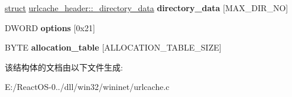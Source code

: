 \begin{DoxyCompactItemize}
\item 
\mbox{\label{structurlcache__header_a15e31b37e8c85a75369972ae50c7c396}} 
\hyperlink{interfacestruct}{struct} \hyperlink{structurlcache__header_1_1__directory__data}{urlcache\+\_\+header\+::\+\_\+directory\+\_\+data} {\bfseries directory\+\_\+data} \mbox{[}M\+A\+X\+\_\+\+D\+I\+R\+\_\+\+NO\mbox{]}
\item 
\mbox{\label{structurlcache__header_ad0e8c7288f1a53180cc921ec951994b8}} 
D\+W\+O\+RD {\bfseries options} \mbox{[}0x21\mbox{]}
\item 
\mbox{\label{structurlcache__header_ac985e20bb7cebff96e5b1aafd7a2c1e6}} 
B\+Y\+TE {\bfseries allocation\+\_\+table} \mbox{[}A\+L\+L\+O\+C\+A\+T\+I\+O\+N\+\_\+\+T\+A\+B\+L\+E\+\_\+\+S\+I\+ZE\mbox{]}
\end{DoxyCompactItemize}


该结构体的文档由以下文件生成\+:\begin{DoxyCompactItemize}
\item 
E\+:/\+React\+O\+S-\/0../dll/win32/wininet/urlcache.\+c\end{DoxyCompactItemize}

